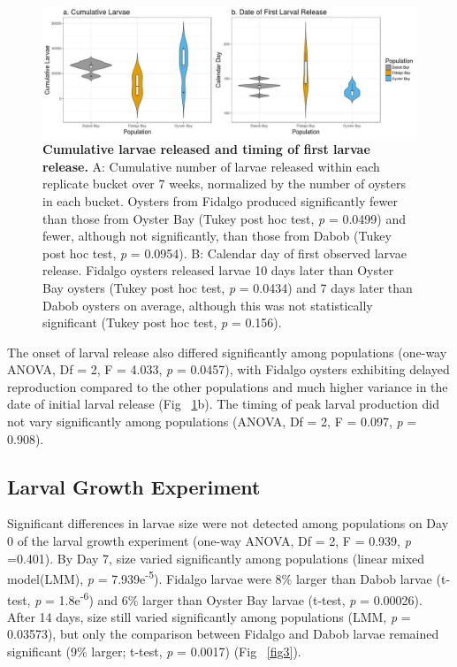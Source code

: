 \documentclass[10pt,letterpaper]{article}
\begin{document}
\begin{figure}[!h]
\includegraphics[width=0.7\linewidth]{Cum_1stDay_Comb_PS2015_color.jpeg}
\caption{{\bf Cumulative larvae released and timing of first larvae release.}
A: Cumulative number of larvae released within each replicate bucket over 7 weeks, normalized by the number of oysters in each bucket. Oysters from Fidalgo produced significantly fewer than those from Oyster Bay (Tukey post hoc test, \textit{p} = 0.0499) and fewer, although not significantly, than those from Dabob (Tukey post hoc test, \textit{p} = 0.0954). B: Calendar day of first observed larvae release. Fidalgo oysters released larvae 10 days later than Oyster Bay oysters (Tukey post hoc test, \textit{p} = 0.0434) and 7 days later than Dabob oysters on average, although this was not statistically significant (Tukey post hoc test, \textit{p} = 0.156).}
\label{fig2}
\end{figure}

The onset of larval release also differed significantly among populations (one-way ANOVA, Df = 2, F = 4.033, \textit{p} = 0.0457), with Fidalgo oysters exhibiting delayed reproduction compared to the other populations and much higher variance in the date of initial larval release (Fig ~\ref{fig2}b). The timing of peak larval production did not vary significantly among populations (ANOVA, Df = 2, F = 0.097, \textit{p} = 0.908).

\subsection*{Larval Growth Experiment}
Significant differences in larvae size were not detected among populations on Day 0 of the larval growth experiment (one-way ANOVA, Df = 2, F = 0.939, \textit{p} =0.401). By Day 7, size varied significantly among populations (linear mixed model(LMM), \textit{p} = 7.939e\textsuperscript{-5}). Fidalgo larvae were 8\% larger than Dabob larvae (t-test, \textit{p} = 1.8e\textsuperscript{-6}) and 6\% larger than Oyster Bay larvae (t-test, \textit{p} = 0.00026). After 14 days, size still varied significantly among populations (LMM, \textit{p} = 0.03573), but only the comparison between Fidalgo and Dabob larvae remained significant (9\% larger; t-test, \textit{p} = 0.0017) (Fig ~\ref{fig3}).
\end{document}
